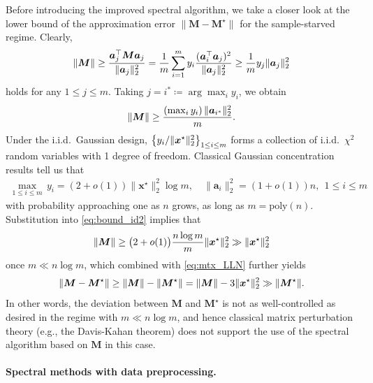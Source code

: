 Before introducing the improved spectral algorithm, we take a closer look at the lower bound of the approximation error $\|\bm{M} - \bm{M}^\star\|$ for the sample-starved regime.  
Clearly,
%
\begin{equation*}
	\lVert\bm{M}\rVert \ge \frac{\bm{a}_j^\top \bm{M} \bm{a}_j}{\| \bm{a}_j \|_2^2}
	=  \frac{1}{m} \sum_{i=1}^m y_i \frac{(\bm{a}_i^\top \bm{a}_j)^2}{\| \bm{a}_j \|_2^2} \geq \frac{1}{m}  y_j  \| \bm{a}_j \|_2^2
\end{equation*}
%
holds for any $1\leq j\leq m$. Taking $j = i^\ast  \coloneqq \arg \max_i  y_i$, we obtain
%
\begin{equation}
	\label{eq:bound_id2}
	\lVert\bm{M}\rVert \ge \frac{(\max_i y_i) \, \| \bm{a}_{i^\ast} \|_2^2}{m}.
\end{equation}
%
Under the i.i.d.~Gaussian design, $\left\{y_i / \| \bm{x}^{\star} \|_2^2\right\}_{1\leq i\leq m}$ forms a collection of i.i.d.~$\chi^2$ random variables with 1 degree of freedom. Classical  Gaussian concentration results \citep{Ferguson:1996,vershynin2016high} tell us that
%
\begin{align*}
	\max_{1\le i\le m}\,y_{i}  =(2+o(1))\|\bm{x}^{\star}\|_{2}^{2}\log m,\quad
	\|\bm{a}_{i}\|_{2}^{2}  = (1+o(1)) n, ~~ 1 \leq i\leq m
\end{align*}
%
with probability approaching one as $n$ grows, as long as $m=\mathrm{poly}(n)$.
Substitution into \eqref{eq:bound_id2} implies that
%
\begin{equation*}
	\lVert\bm{M}\rVert \ge \big(2+o(1)\big)  \frac{ n \log m}{  m} \|\bm{x}^{\star}\|_2^2  \gg \|\bm{x}^{\star}\|_2^2
\end{equation*}
%
once $m\ll n \log m$, which combined with \eqref{eq:mtx_LLN} further yields
%
\[
	\lVert\bm{M} - \bm{M}^{\star}\rVert \geq \lVert\bm{M}\rVert - \lVert\bm{M}^{\star}\rVert
	= \lVert\bm{M}\rVert - 3\|\bm{x}^{\star}\|_2^2 \gg \lVert\bm{M}^{\star}\rVert.
\]
%
In other words, the deviation between $\bm{M}$ and $\bm{M}^{\star}$ is not as well-controlled as desired in the regime with $m\ll n \log m$, and hence classical matrix perturbation theory (e.g., the Davis-Kahan theorem) does not support the use of the spectral algorithm based on $\bm{M}$ in this case.




 





\paragraph{Spectral methods with data preprocessing.}



